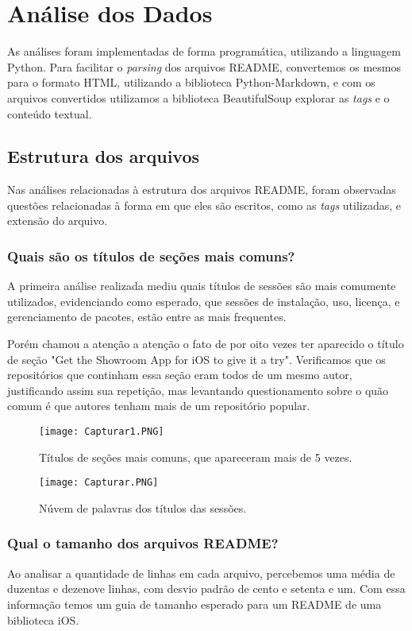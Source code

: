 \documentclass[preprint,12pt,authoryear]{elsarticle}
\begin{document}
\section{Análise dos Dados}
As análises foram implementadas de forma programática, utilizando a linguagem Python. Para facilitar o \textit{parsing} dos arquivos README, convertemos os mesmos para o formato HTML, utilizando a biblioteca Python-Markdown, e com os arquivos convertidos utilizamos a biblioteca BeautifulSoup explorar as \textit{tags} e o conteúdo textual.

\subsection{Estrutura dos arquivos}
Nas análises relacionadas à estrutura dos arquivos README, foram observadas questões relacionadas à forma em que eles são escritos, como as \textit{tags} utilizadas, e extensão do arquivo.

\subsubsection{Quais são os títulos de seções mais comuns?}
A primeira análise realizada mediu quais títulos de sessões são mais comumente utilizados, evidenciando como esperado, que sessões de instalação, uso, licença, e gerenciamento de pacotes, estão entre as mais frequentes. 

Porém chamou a atenção a atenção o fato de por oito vezes ter aparecido o título de seção "Get the Showroom App for iOS to give it a try". Verificamos que os repositórios que continham essa seção eram todos de um mesmo autor, justificando assim sua repetição, mas levantando questionamento sobre o quão comum é que autores tenham mais de um repositório popular.

\begin{figure}[!htb]
\centering
\texttt{[image: Capturar1.PNG]}
\caption{Títulos de seções mais comuns, que apareceram mais de 5 vezes.}
\end{figure}

\begin{figure}[!htb]
\centering
\texttt{[image: Capturar.PNG]}
\caption{Núvem de palavras dos títulos das sessões.}
\end{figure}


\subsubsection{Qual o tamanho dos arquivos README?}
Ao analisar a quantidade de linhas em cada arquivo, percebemos uma média de duzentas e dezenove linhas, com desvio padrão de cento e setenta e um. Com essa informação temos um guia de tamanho esperado para um README de uma biblioteca iOS.
\end{document}
